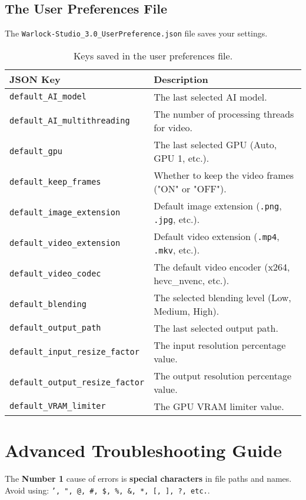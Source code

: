 \documentclass[11pt, a4paper]{article}
\newcommand{\inlinecode}[1]{\colorbox{WarlockLightGray}{\small\texttt{#1}}}
\begin{document}
\subsection{The User Preferences File}
The \inlinecode{Warlock-Studio_3.0_UserPreference.json} file saves your settings.
\begin{table}[H]
    \centering
    \small %
    \begin{tabularx}{\textwidth}{l X}
        \toprule
        \textbf{JSON Key} & \textbf{Description} \\
        \midrule
        \texttt{default\_AI\_model} & The last selected AI model. \\
        \texttt{default\_AI\_multithreading} & The number of processing threads for video. \\
        \texttt{default\_gpu} & The last selected GPU (Auto, GPU 1, etc.). \\
        \texttt{default\_keep\_frames} & Whether to keep the video frames ("ON" or "OFF"). \\
        \texttt{default\_image\_extension} & Default image extension (\texttt{.png}, \texttt{.jpg}, etc.). \\
        \texttt{default\_video\_extension} & Default video extension (\texttt{.mp4}, \texttt{.mkv}, etc.). \\
        \texttt{default\_video\_codec} & The default video encoder (x264, hevc\_nvenc, etc.). \\
        \texttt{default\_blending} & The selected blending level (Low, Medium, High). \\
        \texttt{default\_output\_path} & The last selected output path. \\
        \texttt{default\_input\_resize\_factor} & The input resolution percentage value. \\
        \texttt{default\_output\_resize\_factor} & The output resolution percentage value. \\
        \texttt{default\_VRAM\_limiter} & The GPU VRAM limiter value. \\
        \bottomrule
    \end{tabularx}
    \caption{Keys saved in the user preferences file.}
\end{table}

\section{Advanced Troubleshooting Guide}
\begin{warnbox}
The \textbf{Number 1} cause of errors is \textbf{special characters} in file paths and names. Avoid using: \texttt{', ", @, \#, \$, \%, \&, *, [, ], ?, etc.}.
\end{warnbox}
\end{document}
